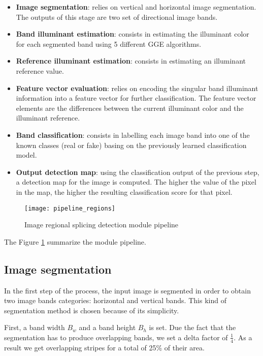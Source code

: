 \begin{itemize}
\item \textbf{Image segmentation}: relies on vertical and horizontal image segmentation. The outputs of this stage are two set of directional image bands. 
\item \textbf{Band illuminant estimation}: consists in estimating the illuminant color for each segmented band using 5 different GGE algorithms.
\item \textbf{Reference illuminant estimation}: consists in estimating an illuminant reference value.
\item \textbf{Feature vector evaluation}: relies on encoding the singular band illuminant information into a feature vector for further classification. The feature vector elements are the differences between the current illuminant color and the illuminant reference.
\item \textbf{Band classification}: consists in labelling each image band into one of the known classes (real or fake) basing on the previously learned classification model.
\item \textbf{Output detection map}: using the classification output of the previous step, a detection map for the image is computed. The higher the value of the pixel in the map, the higher the resulting classification score for that pixel.
\end{itemize}

\begin{figure}[h!]
  \centering
    \texttt{[image: pipeline\_regions]}
    \caption{Image regional splicing detection module pipeline}
    \label{fig:regionsmodulepipeline}
\end{figure}

The Figure \ref{fig:regionsmodulepipeline} summarize the module pipeline.

\subsection{Image segmentation}

In the first step of the process, the input image is segmented in order to obtain two image bands categories: horizontal and vertical bands. This kind of segmentation method is chosen because of its simplicity.

First, a band width $B_w$ and a band height $B_h$ is set. Due the fact that the segmentation has to produce overlapping bands, we set a delta factor of $\frac{1}{4}$. As a result we get overlapping stripes for a total of 25\% of their area. 

